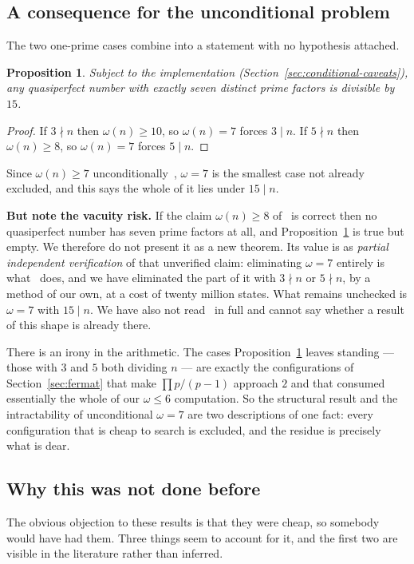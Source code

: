 \documentclass[11pt]{amsart}
\newtheorem{proposition}[theorem]{Proposition}
\theoremstyle{remark}
\begin{document}
\subsection{A consequence for the unconditional problem}\label{sec:forced15}
The two one-prime cases combine into a statement with no hypothesis attached.

\begin{proposition}\label{prop:forced15}
Subject to the implementation (Section~\ref{sec:conditional-caveats}), any
quasiperfect number with exactly seven distinct prime factors is divisible by
$15$.
\end{proposition}
\begin{proof}
If $3 \nmid n$ then $\omega(n) \ge 10$, so $\omega(n) = 7$ forces $3 \mid n$. If
$5 \nmid n$ then $\omega(n) \ge 8$, so $\omega(n) = 7$ forces $5 \mid n$.
\end{proof}

Since $\omega(n) \ge 7$ unconditionally~\cite{hagiscohen}, $\omega = 7$ is the
smallest case not already excluded, and this says the whole of it lies under
$15 \mid n$.

\medskip\noindent\textbf{But note the vacuity risk.} If the claim
$\omega(n) \ge 8$ of~\cite{tty} is correct then no quasiperfect number has seven
prime factors at all, and Proposition~\ref{prop:forced15} is true but empty. We
therefore do not present it as a new theorem. Its value is as \emph{partial
independent verification} of that unverified claim: eliminating $\omega = 7$
entirely is what~\cite{tty} does, and we have eliminated the part of it with
$3 \nmid n$ or $5 \nmid n$, by a method of our own, at a cost of twenty million
states. What remains unchecked is $\omega = 7$ with $15 \mid n$. We have also not
read~\cite{hagiscohen} in full and cannot say whether a result of this shape is
already there.

\medskip\noindent There is an irony in the arithmetic. The cases
Proposition~\ref{prop:forced15} leaves standing --- those with $3$ and $5$ both
dividing $n$ --- are exactly the configurations of
Section~\ref{sec:fermat} that make $\prod p/(p-1)$ approach $2$ and that consumed
essentially the whole of our $\omega \le 6$ computation. So the structural result
and the intractability of unconditional $\omega = 7$ are two descriptions of one
fact: every configuration that is cheap to search is excluded, and the residue is
precisely what is dear.

\subsection{Why this was not done before}\label{sec:whynot}
The obvious objection to these results is that they were cheap, so somebody would
have had them. Three things seem to account for it, and the first two are visible
in the literature rather than inferred.
\end{document}
